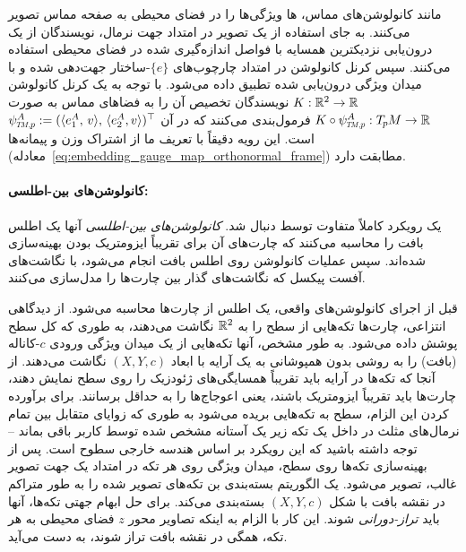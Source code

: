 مانند کانولوشن‌های مماس، ها ویژگی‌ها را در فضای محیطی به صفحه مماس تصویر می‌کنند.
به جای استفاده از یک تصویر در امتداد جهت نرمال، نویسندگان از یک درون‌یابی نزدیکترین همسایه با فواصل اندازه‌گیری شده در فضای محیطی استفاده می‌کنند.
سپس کرنل کانولوشن در امتداد چارچوب‌های $\{e\}$-ساختار جهت‌دهی شده و با میدان ویژگی درون‌یابی شده تطبیق داده می‌شود.
با توجه به یک کرنل کانولوشن $K: \mathbb{R}^2 \to \mathbb{R}$ نویسندگان تخصیص آن را به فضاهای مماس به صورت $K \circ \psiTMp^A: \TpM \to \R$ فرمول‌بندی می‌کنند که در آن $\psiTMp^A := (\langle e_1^A,\,v\rangle,\, \langle e_2^A,v\rangle )^\top$ است.
این رویه دقیقاً با تعریف ما از اشتراک وزن و پیمانه‌ها (معادله~\eqref{eq:embedding_gauge_map_orthonormal_frame}) مطابقت دارد.








\paragraph{کانولوشن‌های بین-اطلسی:}
یک رویکرد کاملاً متفاوت توسط \citet{li2019crossAtlas} دنبال شد.
\emph{کانولوشن‌های بین-اطلسی} آنها یک اطلس بافت را محاسبه می‌کنند که چارت‌های آن برای تقریباً ایزومتریک بودن بهینه‌سازی شده‌اند.
سپس عملیات کانولوشن روی اطلس بافت انجام می‌شود، با نگاشت‌های آفست پیکسل که نگاشت‌های گذار بین چارت‌ها را مدل‌سازی می‌کنند.

قبل از اجرای کانولوشن‌های واقعی، یک اطلس از چارت‌ها محاسبه می‌شود.
از دیدگاهی انتزاعی، چارت‌ها تکه‌هایی از سطح را به $\mathbb{R}^2$ نگاشت می‌دهند، به طوری که کل سطح پوشش داده می‌شود.
به طور مشخص، آنها تکه‌هایی از یک میدان ویژگی ورودی $c$-کاناله (بافت) را به روشی بدون همپوشانی به یک آرایه با ابعاد $(X,Y,c)$ نگاشت می‌دهند.
از آنجا که تکه‌ها در آرایه باید تقریباً همسایگی‌های ژئودزیک را روی سطح نمایش دهند، چارت‌ها باید تقریباً ایزومتریک باشند، یعنی اعوجاج‌ها را به حداقل برسانند.
برای برآورده کردن این الزام، سطح به تکه‌هایی بریده می‌شود به طوری که زوایای متقابل بین تمام نرمال‌های مثلث در داخل یک تکه زیر یک آستانه مشخص شده توسط کاربر باقی بماند -- توجه داشته باشید که این رویکرد بر اساس هندسه خارجی سطوح است.
پس از بهینه‌سازی تکه‌ها روی سطح، میدان ویژگی روی هر تکه در امتداد یک جهت تصویر غالب، تصویر می‌شود.
یک الگوریتم بسته‌بندی بن  تکه‌های تصویر شده را به طور متراکم در نقشه بافت با شکل $(X,Y,c)$ بسته‌بندی می‌کند.
برای حل ابهام جهتی تکه‌ها، آنها باید \emph{تراز-دورانی} شوند.
این کار با الزام به اینکه تصاویر محور $z$ فضای محیطی به هر تکه، همگی در نقشه بافت تراز شوند، به دست می‌آید.

